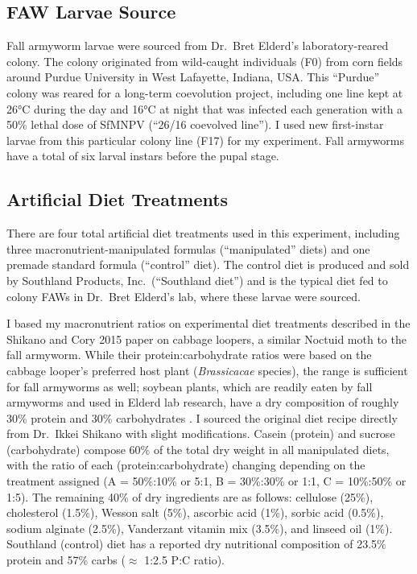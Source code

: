 \documentclass[12pt,]{article}
\begin{document}
\hypertarget{faw-larvae-source}{%
\subsection{\texorpdfstring{\textbf{FAW Larvae
Source}}{FAW Larvae Source}}\label{faw-larvae-source}}

Fall armyworm larvae were sourced from Dr.~Bret Elderd's
laboratory-reared colony. The colony originated from wild-caught
individuals (F0) from corn fields around Purdue University in West
Lafayette, Indiana, USA. This ``Purdue'' colony was reared for a
long-term coevolution project, including one line kept at 26°C during
the day and 16°C at night that was infected each generation with a 50\%
lethal dose of SfMNPV (``26/16 coevolved line''). I used new
first-instar larvae from this particular colony line (F17) for my
experiment. Fall armyworms have a total of six larval instars before the
pupal stage.

\hypertarget{artificial-diet-treatments}{%
\subsection{\texorpdfstring{\textbf{Artificial Diet
Treatments}}{Artificial Diet Treatments}}\label{artificial-diet-treatments}}

There are four total artificial diet treatments used in this experiment,
including three macronutrient-manipulated formulas (``manipulated''
diets) and one premade standard formula (``control'' diet). The control
diet is produced and sold by Southland Products, Inc.~(``Southland
diet'') \autocite{noauthor_southland_nodate} and is the typical diet fed
to colony FAWs in Dr.~Bret Elderd's lab, where these larvae were
sourced.

I based my macronutrient ratios on experimental diet treatments
described in the Shikano and Cory 2015 \autocite{shikano_impact_2015}
paper on cabbage loopers, a similar Noctuid moth to the fall armyworm.
While their protein:carbohydrate ratios were based on the cabbage
looper's preferred host plant (\emph{Brassicacae} species), the range is
sufficient for fall armyworms as well; soybean plants, which are readily
eaten by fall armyworms and used in Elderd lab research, have a dry
composition of roughly 30\% protein and 30\% carbohydrates
\autocite{wrigley_encyclopedia_2004}. I sourced the original diet recipe
directly from Dr.~Ikkei Shikano with slight modifications. Casein
(protein) and sucrose (carbohydrate) compose 60\% of the total dry
weight in all manipulated diets, with the ratio of each
(protein:carbohydrate) changing depending on the treatment assigned (A =
50\%:10\% or 5:1, B = 30\%:30\% or 1:1, C = 10\%:50\% or 1:5). The
remaining 40\% of dry ingredients are as follows: cellulose (25\%),
cholesterol (1.5\%), Wesson salt (5\%), ascorbic acid (1\%), sorbic acid
(0.5\%), sodium alginate (2.5\%), Vanderzant vitamin mix (3.5\%), and
linseed oil (1\%). Southland (control) diet has a reported dry
nutritional composition of 23.5\% protein and 57\% carbs (\(\approx\)
1:2.5 P:C ratio).
\end{document}
